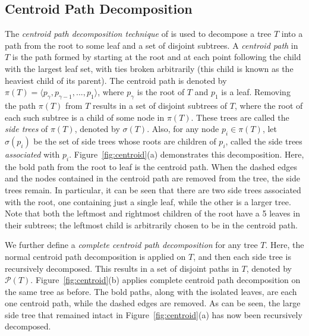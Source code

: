 \documentclass{article}
\begin{document}
    \subsection{Centroid Path Decomposition}

    The \textit{centroid path decomposition technique} of \cite{cole2000n} is used to decompose a tree $T$ into a path from the root to some leaf and a set of disjoint subtrees. A \textit{centroid path} in $T$ is the path formed by starting at the root and at each point following the child with the largest leaf set, with ties broken arbitrarily (this child is known as the heaviest child of its parent). The centroid path is denoted by $\pi(T) = \langle p_{\gamma}, p_{\gamma - 1}, ..., p_1 \rangle$, where $p_{\gamma}$ is the root of $T$ and $p_1$ is a leaf. Removing the path $\pi(T)$ from $T$ results in a set of disjoint subtrees of $T$, where the root of each such subtree is a child of some node in $\pi(T)$. These trees are called the \textit{side trees} of $\pi(T)$, denoted by $\sigma(T)$. Also, for any node $p_i \in \pi(T)$, let $\sigma(p_i)$ be the set of side trees whose roots are children of $p_i$, called the side trees \textit{associated} with $p_i$. Figure~\ref{fig:centroid}(a) demonstrates this decomposition. Here, the bold path from the root to leaf is the centroid path. When the dashed edges and the nodes contained in the centroid path are removed from the tree, the side trees remain. In particular, it can be seen that there are two side trees associated with the root, one containing just a single leaf, while the other is a larger tree. Note that both the leftmost and rightmost children of the root have a 5 leaves in their subtrees; the leftmost child is arbitrarily chosen to be in the centroid path.

    We further define a \textit{complete centroid path decomposition} for any tree $T$. Here, the normal centroid path decomposition is applied on $T$, and then each side tree is recursively decomposed. This results in a set of disjoint paths in $T$, denoted by $\mathcal{P}(T)$. Figure~\ref{fig:centroid}(b) applies complete centroid path decomposition on the same tree as before. The bold paths, along with the isolated leaves, are each one centroid path, while the dashed edges are removed. As can be seen, the large side tree that remained intact in Figure~\ref{fig:centroid}(a) has now been recursively decomposed.
\end{document}

